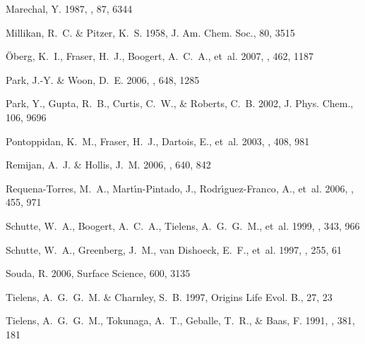 \documentclass{aa}
\begin{document}
\begin{thebibliography}{38}
{Marechal}, Y. 1987, \jcp, 87, 6344

{Millikan}, R.~C. \& {Pitzer}, K.~S. 1958, J. Am. Chem. Soc., 80, 3515

{{\"O}berg}, K.~I., {Fraser}, H.~J., {Boogert}, A.~C.~A., {et~al.} 2007, \aap,
  462, 1187

{Park}, J.-Y. \& {Woon}, D.~E. 2006, \apj, 648, 1285

{Park}, Y., {Gupta}, R.~B., {Curtis}, C.~W., \& {Roberts}, C.~B. 2002, J. Phys.
  Chem., 106, 9696

{Pontoppidan}, K.~M., {Fraser}, H.~J., {Dartois}, E., {et~al.} 2003, \aap, 408,
  981

{Remijan}, A.~J. \& {Hollis}, J.~M. 2006, \apj, 640, 842

{Requena-Torres}, M.~A., {Mart{\'{\i}}n-Pintado}, J.,
  {Rodr{\'{\i}}guez-Franco}, A., {et~al.} 2006, \aap, 455, 971

{Schutte}, W.~A., {Boogert}, A.~C.~A., {Tielens}, A.~G.~G.~M., {et~al.} 1999,
  \aap, 343, 966

{Schutte}, W.~A., {Greenberg}, J.~M., {van Dishoeck}, E.~F., {et~al.} 1997,
  \apss, 255, 61

{Souda}, R. 2006, Surface Science, 600, 3135

{Tielens}, A.~G.~G.~M. \& {Charnley}, S.~B. 1997, Origins Life Evol. B., 27, 23

{Tielens}, A.~G.~G.~M., {Tokunaga}, A.~T., {Geballe}, T.~R., \& {Baas}, F.
  1991, \apj, 381, 181


\end{thebibliography}
\end{document}
